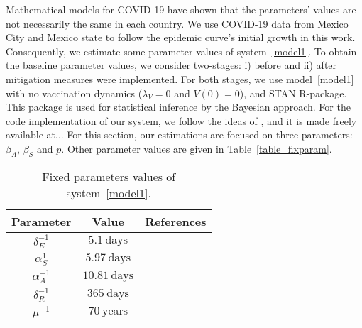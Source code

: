 
Mathematical models for COVID-19 have shown that the
parameters' values are not necessarily the same in each country. We use
COVID-19 data from Mexico City and Mexico state to follow the epidemic
curve's initial growth in this work. Consequently, we estimate some
parameter values of system~\eqref{model1}. To obtain the baseline
parameter values, we consider two-stages: i) before and ii) after
mitigation measures were implemented. For both stages, we use
model~\eqref{model1} with no vaccination dynamics ($\lambda_V = 0$ and
$V(0) = 0$), and STAN R-package. This package is used for statistical
inference by the Bayesian approach. For the code implementation of our
system, we follow the ideas of \cite{Chatzilena2019}, and it is made
freely available at... For this section, our estimations are focused on
three parameters: $\beta_A$, $\beta_S$ and $p$. Other parameter values
are given in Table~\eqref{table_fixparam}.
\begin{table}[h!]
\begin{center}
    \begin{tabular}{ccc}
    \toprule
        Parameter & Value & References
        \\
        \midrule
        $\delta_{E}^{-1}$ & $5.1\ \text{days}$   &  \cite{Tian2020}
        \\
        $\alpha_{S}^{1}$  & $5.97\ \text{days}$  &  \cite{Acuna2020}
        \\
        $\alpha_{A}^{-1}$ & $10.81\ \text{days}$ & \cite{Acuna2020}
        \\
        $\delta_{R}^{-1}$ & $365\ \text{days}$     &
        \\
        $\mu^{-1}$        & $70\ \text{years}$   &
        \\
        \bottomrule
    \end{tabular}
        \caption{Fixed parameters values of
    system~\eqref{model1}.}\label{table_fixparam}
    \end{center}
\end{table}

